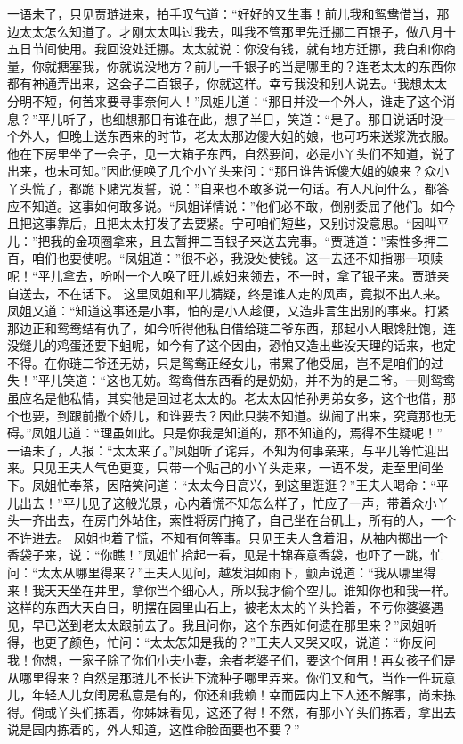\documentclass[12pt,oneside]{book}
\begin{document}
一语未了，只见贾琏进来，拍手叹气道：“好好的又生事！前儿我和鸳鸯借当，那边太太怎么知道了。才刚太太叫过我去，叫我不管那里先迁挪二百银子，做八月十五日节间使用。我回没处迁挪。太太就说：你没有钱，就有地方迁挪，我白和你商量，你就搪塞我，你就说没地方？前儿一千银子的当是哪里的？连老太太的东西你都有神通弄出来，这会子二百银子，你就这样。幸亏我没和别人说去。‘我想太太分明不短，何苦来要寻事奈何人！”凤姐儿道：“那日并没一个外人，谁走了这个消息？”平儿听了，也细想那日有谁在此，想了半日，笑道：“是了。那日说话时没一个外人，但晚上送东西来的时节，老太太那边傻大姐的娘，也可巧来送浆洗衣服。他在下房里坐了一会子，见一大箱子东西，自然要问，必是小丫头们不知道，说了出来，也未可知。”因此便唤了几个小丫头来问：“那日谁告诉傻大姐的娘来？众小丫头慌了，都跪下赌咒发誓，说：”自来也不敢多说一句话。有人凡问什么，都答应不知道。这事如何敢多说。“凤姐详情说：”他们必不敢，倒别委屈了他们。如今且把这事靠后，且把太太打发了去要紧。宁可咱们短些，又别讨没意思。“因叫平儿：”把我的金项圈拿来，且去暂押二百银子来送去完事。“贾琏道：”索性多押二百，咱们也要使呢。“凤姐道：”很不必，我没处使钱。这一去还不知指哪一项赎呢！“平儿拿去，吩咐一个人唤了旺儿媳妇来领去，不一时，拿了银子来。贾琏亲自送去，不在话下。
这里凤姐和平儿猜疑，终是谁人走的风声，竟拟不出人来。凤姐又道：“知道这事还是小事，怕的是小人趁便，又造非言生出别的事来。打紧那边正和鸳鸯结有仇了，如今听得他私自借给琏二爷东西，那起小人眼馋肚饱，连没缝儿的鸡蛋还要下蛆呢，如今有了这个因由，恐怕又造出些没天理的话来，也定不得。在你琏二爷还无妨，只是鸳鸯正经女儿，带累了他受屈，岂不是咱们的过失！”平儿笑道：“这也无妨。鸳鸯借东西看的是奶奶，并不为的是二爷。一则鸳鸯虽应名是他私情，其实他是回过老太太的。老太太因怕孙男弟女多，这个也借，那个也要，到跟前撒个娇儿，和谁要去？因此只装不知道。纵闹了出来，究竟那也无碍。”凤姐儿道：“理虽如此。只是你我是知道的，那不知道的，焉得不生疑呢！”
一语未了，人报：“太太来了。”凤姐听了诧异，不知为何事亲来，与平儿等忙迎出来。只见王夫人气色更变，只带一个贴己的小丫头走来，一语不发，走至里间坐下。凤姐忙奉茶，因陪笑问道：“太太今日高兴，到这里逛逛？”王夫人喝命：“平儿出去！”平儿见了这般光景，心内着慌不知怎么样了，忙应了一声，带着众小丫头一齐出去，在房门外站住，索性将房门掩了，自己坐在台矶上，所有的人，一个不许进去。
凤姐也着了慌，不知有何等事。只见王夫人含着泪，从袖内掷出一个香袋子来，说：“你瞧！”凤姐忙拾起一看，见是十锦春意香袋，也吓了一跳，忙问：“太太从哪里得来？”王夫人见问，越发泪如雨下，颤声说道：“我从哪里得来！我天天坐在井里，拿你当个细心人，所以我才偷个空儿。谁知你也和我一样。这样的东西大天白日，明摆在园里山石上，被老太太的丫头拾着，不亏你婆婆遇见，早已送到老太太跟前去了。我且问你，这个东西如何遗在那里来？”凤姐听得，也更了颜色，忙问：“太太怎知是我的？”王夫人又哭又叹，说道：“你反问我！你想，一家子除了你们小夫小妻，余者老婆子们，要这个何用！再女孩子们是从哪里得来？自然是那琏儿不长进下流种子哪里弄来。你们又和气，当作一件玩意儿，年轻人儿女闺房私意是有的，你还和我赖！幸而园内上下人还不解事，尚未拣得。倘或丫头们拣着，你姊妹看见，这还了得！不然，有那小丫头们拣着，拿出去说是园内拣着的，外人知道，这性命脸面要也不要？”
\end{document}
